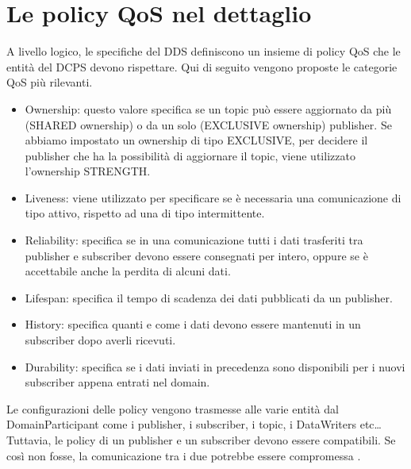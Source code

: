 \section{Le policy QoS nel dettaglio}
A livello logico, le specifiche del DDS
definiscono un insieme di policy QoS
che le entità del DCPS devono rispettare. Qui di seguito vengono
proposte le categorie QoS più rilevanti.
\begin{itemize}
    \item Ownership: questo valore specifica se un topic
    può essere aggiornato da più 
    (SHARED ownership) o da un solo (EXCLUSIVE ownership) publisher.
    Se abbiamo impostato un ownership di tipo EXCLUSIVE, per decidere il 
    publisher che ha la possibilità di aggiornare il topic, viene 
    utilizzato l'ownership STRENGTH.
    \item Liveness: viene utilizzato per specificare se è necessaria
    una comunicazione di tipo attivo, rispetto ad una di tipo 
    intermittente.
    \item Reliability: specifica se in una comunicazione tutti i dati
    trasferiti tra publisher e subscriber devono essere consegnati
    per intero, oppure
    se è accettabile anche la perdita di alcuni dati.
    \item Lifespan: specifica il tempo di scadenza dei dati pubblicati da 
    un publisher.
    \item History: specifica quanti e come i dati devono essere 
    mantenuti in un 
    subscriber dopo averli ricevuti.
    \item Durability: specifica se i dati inviati in precedenza sono
    disponibili per i nuovi subscriber appena entrati nel domain.
\end{itemize}
Le configurazioni 
delle policy vengono trasmesse alle varie entità dal DomainParticipant
come i publisher, i subscriber, i topic, i DataWriters etc\dots
Tuttavia, le policy di un publisher e un subscriber devono essere compatibili.
Se così non fosse, la comunicazione tra i due potrebbe essere compromessa
\cite{Michaud2017Apr}.
\label{Le policy QoS nel dettaglio}



